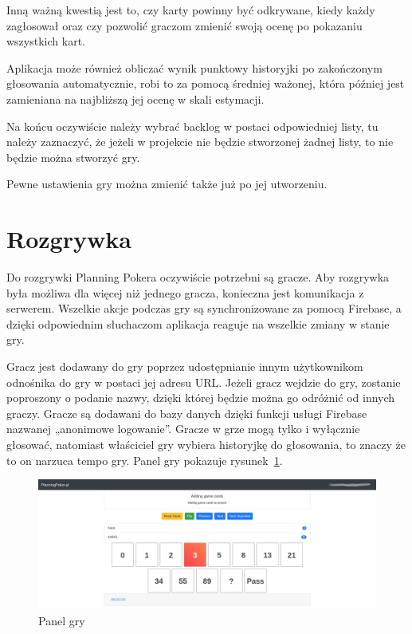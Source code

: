 Inną ważną kwestią jest to, czy karty powinny być odkrywane, kiedy każdy zagłosował
oraz czy pozwolić graczom zmienić swoją ocenę po pokazaniu wszystkich kart.

Aplikacja może również obliczać wynik punktowy historyjki po zakończonym głosowania automatycznie,
robi to za pomocą średniej ważonej, która później jest zamieniana na najbliższą jej ocenę w skali estymacji.

Na końcu oczywiście należy wybrać backlog w postaci odpowiedniej listy, tu należy zaznaczyć,
że jeżeli w projekcie nie będzie stworzonej żadnej listy, to nie będzie można stworzyć gry.

Pewne ustawienia gry można zmienić także już po jej utworzeniu.

\section{Rozgrywka}

Do rozgrywki Planning Pokera oczywiście potrzebni są gracze.
Aby rozgrywka była możliwa dla więcej niż jednego gracza, konieczna jest komunikacja z serwerem.
Wszelkie akcje podczas gry są synchronizowane za pomocą Firebase,
a dzięki odpowiednim słuchaczom aplikacja reaguje na wszelkie zmiany w stanie gry.

Gracz jest dodawany do gry poprzez udostępnianie innym użytkownikom odnośnika do gry
w postaci jej adresu URL\@.
Jeżeli gracz wejdzie do gry, zostanie poproszony o podanie nazwy,
dzięki której będzie można go odróżnić od innych graczy.
Gracze są dodawani do bazy danych dzięki funkcji usługi Firebase nazwanej „anonimowe logowanie”.
Gracze w grze mogą tylko i wyłącznie głosować,
natomiast właściciel gry wybiera historyjkę do głosowania, to znaczy że to on narzuca tempo gry.
Panel gry pokazuje rysunek~\ref{rys:gra}.

\begin{figure}[h]
	\centering\includegraphics[width=\textwidth]{img/gra.png}
	\caption{Panel gry}\label{rys:gra}%
\end{figure}

